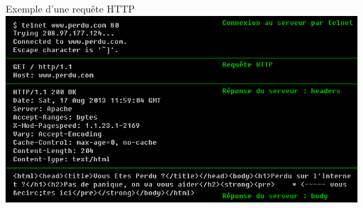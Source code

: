 \begin{frame}{Exemple d'une requête HTTP}
    \includegraphics[width=\linewidth]{../medias/perdu.png}
\end{frame}


